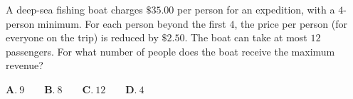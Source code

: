 A deep-sea fishing boat charges $\$35.00$ per person for an expedition, with a $4$-person minimum. For each person beyond the first $4$, the price per person (for everyone on the trip) is reduced by $\$2.50$. The boat can take at most $12$ passengers. For what number of people does the boat receive the maximum revenue?

$\textbf{A.}\ 9\qquad\textbf{B.}\ 8\qquad\textbf{C.}\ 12\qquad\textbf{D.}\ 4$
